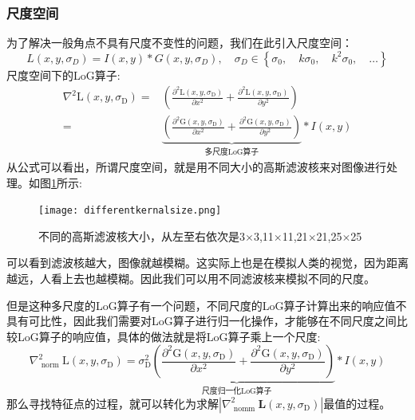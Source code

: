 \subsubsection{尺度空间}
为了解决一般角点不具有尺度不变性的问题，我们在此引入尺度空间：
\begin{equation}
L\left(x, y, \sigma_{D}\right)=I(x, y) * G\left(x, y, \sigma_{D}\right), \quad \sigma_{D} \in\left\{\sigma_{0}, \quad k \sigma_{0}, \quad k^{2} \sigma_{0}, \quad \dots\right\}
\end{equation}
尺度空间下的LoG算子:
\begin{equation}
\begin{aligned}
\nabla^{2} \mathrm{L}\left(x, y, \sigma_{\mathrm{D}}\right)=&\left(\frac{\partial^{2} \mathrm{L}\left(x, y, \sigma_{\mathrm{D}}\right)}{\partial x^{2}}+\frac{\partial^{2} \mathrm{L}\left(x, y, \sigma_{\mathrm{D}}\right)}{\partial y^{2}}\right)\\
=&\underbrace{\left(\frac{\partial^{2} \mathrm{G}\left(x, y, \sigma_{\mathrm{D}}\right)}{\partial x^{2}}+\frac{\partial^{2} \mathrm{G}\left(x, y, \sigma_{\mathrm{D}}\right)}{\partial y^{2}}\right)}_\text{多尺度LoG算子}*I(x,y)
\end{aligned}
\end{equation}
从公式可以看出，所谓尺度空间，就是用不同大小的高斯滤波核来对图像进行处理。如图\ref{differentkernalsize}所示:
\begin{figure}[H]
	\centering
	\texttt{[image: differentkernalsize.png]}
	\caption{不同的高斯滤波核大小，从左至右依次是3$\times$3,11$\times$11,21$\times$21,25$\times$25}\label{differentkernalsize}
\end{figure}\par
可以看到滤波核越大，图像就越模糊。这实际上也是在模拟人类的视觉，因为距离越远，人看上去也越模糊。因此我们可以用不同滤波核来模拟不同的尺度。\par
但是这种多尺度的LoG算子有一个问题，不同尺度的LoG算子计算出来的响应值不具有可比性，因此我们需要对LoG算子进行归一化操作，才能够在不同尺度之间比较LoG算子的响应值，具体的做法就是将LoG算子乘上一个尺度:
\begin{equation}
\nabla_{\text { norm }}^{2} \mathrm{L}\left(x, y, \sigma_{\mathrm{D}}\right)= 
\underbrace{\sigma_{\mathrm{D}}^{2}\left(\frac{\partial^{2} \mathrm{G}\left(x, y, \sigma_{\mathrm{D}}\right)}{\partial x^{2}}+\frac{\partial^{2} \mathrm{G}\left(x, y, \sigma_{\mathrm{D}}\right)}{\partial y^{2}}\right)}_\text{尺度归一化LoG算子} * I(x, y)
\end{equation}
那么寻找特征点的过程，就可以转化为求解$| \nabla_{\text { nomm }}^{2} \mathbf{L}\left(x, y, \sigma_{\mathrm{D}}\right) |$最值的过程。
